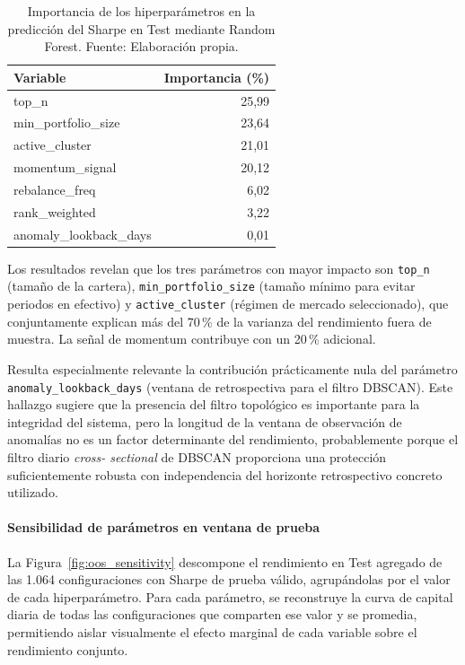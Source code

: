 \begin{table}[H]
\centering
\begin{tabular}{lr}
\toprule
\textbf{Variable} & \textbf{Importancia (\%)} \\
\midrule
top\_n                   & 25,99 \\
min\_portfolio\_size     & 23,64 \\
active\_cluster          & 21,01 \\
momentum\_signal         & 20,12 \\
rebalance\_freq          & 6,02  \\
rank\_weighted           & 3,22  \\
anomaly\_lookback\_days  & 0,01  \\
\bottomrule
\end{tabular}
\caption{Importancia de los hiperparámetros en la predicción del
Sharpe en Test mediante Random Forest. Fuente: Elaboración propia.}
\label{tab:feature_importance}
\end{table}

Los resultados revelan que los tres parámetros con mayor impacto
son \texttt{top\_n} (tamaño de la cartera), \texttt{min\_portfolio\_size}
(tamaño mínimo para evitar periodos en efectivo) y
\texttt{active\_cluster} (régimen de mercado seleccionado), que
conjuntamente explican más del 70\,\% de la varianza del
rendimiento fuera de muestra. La señal de momentum contribuye
con un 20\,\% adicional.

Resulta especialmente relevante la contribución prácticamente
nula del parámetro \texttt{anomaly\_lookback\_days} (ventana de
retrospectiva para el filtro DBSCAN). Este hallazgo sugiere que
la presencia del filtro topológico es importante para la
integridad del sistema, pero la longitud de la ventana de
observación de anomalías no es un factor determinante del
rendimiento, probablemente porque el filtro diario \textit{cross-
sectional} de DBSCAN proporciona una protección suficientemente
robusta con independencia del horizonte retrospectivo concreto
utilizado.

\paragraph{Sensibilidad de parámetros en ventana de prueba}

La Figura~\ref{fig:oos_sensitivity} descompone el rendimiento en Test agregado de las 1.064 configuraciones con Sharpe
de prueba válido, agrupándolas por el valor de cada
hiperparámetro. Para cada parámetro, se reconstruye la curva de
capital diaria de todas las configuraciones que comparten ese
valor y se promedia, permitiendo aislar visualmente el efecto
marginal de cada variable sobre el rendimiento conjunto.

